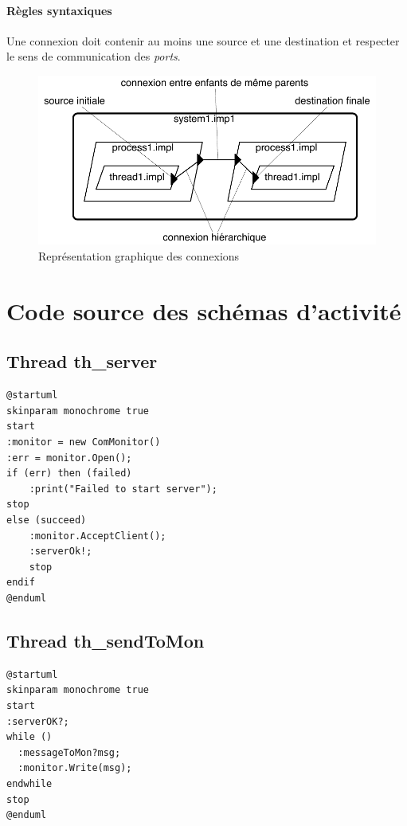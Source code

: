 \documentclass[11pt,a4paper]{paper}
\begin{document}
\begin{appendices}
\paragraph{Règles syntaxiques} Une connexion doit contenir au moins une source et une destination et respecter le sens de communication des {\em ports}.


\begin{figure}[htbp]
\begin{center}
\includegraphics[scale=.6]{figures_pdf/connexion2.pdf}
\caption{Représentation graphique des connexions}
\end{center}
\end{figure}
\FloatBarrier

\newpage
\section{Code source des schémas d'activité}

\begin{multicols}{2}
\subsection{Thread th\_server}
{\scriptsize
\begin{verbatim}
@startuml
skinparam monochrome true
start
:monitor = new ComMonitor()
:err = monitor.Open();
if (err) then (failed)
    :print("Failed to start server");
stop
else (succeed)
    :monitor.AcceptClient();
    :serverOk!;
    stop
endif
@enduml
\end{verbatim}}

\subsection{Thread th\_sendToMon}
{\scriptsize
\begin{verbatim}
@startuml
skinparam monochrome true
start
:serverOK?;
while ()
  :messageToMon?msg;
  :monitor.Write(msg);
endwhile
stop
@enduml
\end{verbatim}
}


\end{multicols}
\end{appendices}
\end{document}
